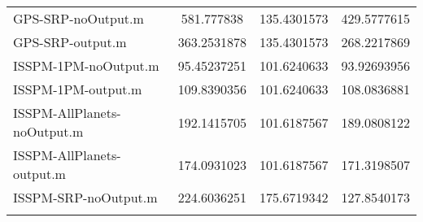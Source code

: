 \begin{table}[htbp!]
\begin{tabular}{lccc}
         GPS-SRP-noOutput.m & 581.777838 & 135.4301573 & 429.5777615 \\
         GPS-SRP-output.m & 363.2531878 & 135.4301573 & 268.2217869 \\
         ISSPM-1PM-noOutput.m & 95.45237251 & 101.6240633 & 93.92693956 \\
         ISSPM-1PM-output.m & 109.8390356 & 101.6240633 & 108.0836881 \\
         ISSPM-AllPlanets-noOutput.m & 192.1415705 & 101.6187567 & 189.0808122 \\
         ISSPM-AllPlanets-output.m & 174.0931023 & 101.6187567 & 171.3198507 \\
         ISSPM-SRP-noOutput.m & 224.6036251 & 175.6719342 & 127.8540173 \\
      \hline\hline
      \label{Table: Performance3-1} 
\end{tabular}
\end{table}
